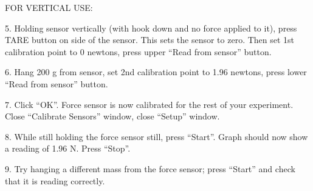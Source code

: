 FOR VERTICAL USE:

5. Holding sensor vertically (with hook down and no force applied to it), press TARE button on side of the sensor. This sets the sensor to zero. Then set 1st calibration point to 0 newtons, press upper ``Read from sensor'' button.

6. Hang 200 g from sensor, set 2nd calibration point to 1.96 newtons, press lower ``Read from sensor'' button.

7. Click ``OK''. Force sensor is now calibrated for the rest of your experiment. Close ``Calibrate Sensors'' window, close ``Setup'' window.

8. While still holding the force sensor still, press ``Start''. Graph should now show a reading of 1.96 N. Press ``Stop''.

9. Try hanging a different mass from the force sensor; press ``Start'' and check that it is reading correctly.

